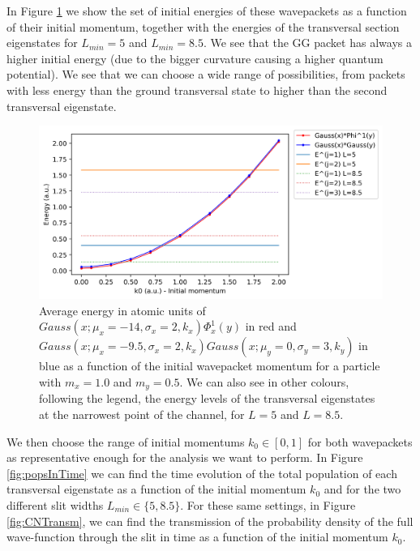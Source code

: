 \documentclass[11pt, a4paper]{article} %
\begin{document}
In Figure \ref{fig:energies} we show the set of initial energies of these wavepackets as a function of their initial momentum, together with the energies of the transversal section eigenstates for $L_{min}=5$ and $L_{min}=8.5$. We see that the GG packet has always a higher initial energy (due to the bigger curvature causing a higher quantum potential). We see that we can choose a wide range of possibilities, from packets with less energy than the ground transversal state to higher than the second transversal eigenstate. 

\begin{figure}[h!]
  \centering
    \includegraphics[width=0.7\linewidth]{Evsk_GS_GG_L8_5.png}
  \caption{Average energy in atomic units of $Gauss(x;\mu_x=-14, \sigma_x=2, k_x)\Phi^1_x(y)$ in red and $Gauss(x;\mu_x=-9.5, \sigma_x=2, k_x)Gauss(x;\mu_y=0, \sigma_y=3, k_y)$ in blue as a function of the initial wavepacket momentum for a particle with $m_x=1.0$ and $m_y=0.5$. We can also see in other colours, following the legend, the energy levels of the transversal eigenstates at the narrowest point of the channel, for $L=5$ and $L=8.5$.}
  \label{fig:energies}
\end{figure}


We then choose the range of initial momentums $ k_0 \in [ 0,1 ]$ for both wavepackets as representative enough for the analysis we want to perform. In Figure \ref{fig:popsInTime} we can find the time evolution of the total population of each transversal eigenstate as a function of the initial momentum $k_0$ and for the two different slit widths $L_{min}\in\{5, 8.5\}$. For these same settings, in Figure \ref{fig:CNTransm}, we can find the transmission of the probability density of the full wave-function through the slit in time as a function of the initial momentum $k_0$.\vspace{-0.3cm}
\end{document}
